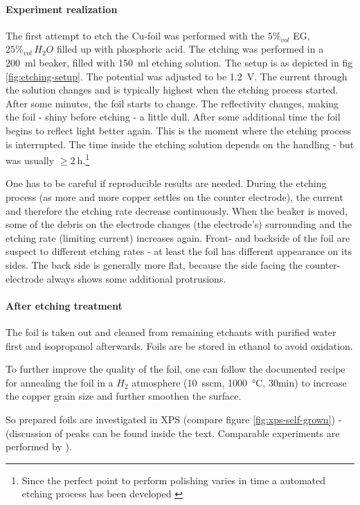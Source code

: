 
\paragraph{Experiment realization}The first attempt to etch the Cu-foil was performed with the $5\%_{vol}$ EG, $25\%_{vol}\,H_2O$ filled up with phosphoric acid. The etching was performed in a \SI{200}{\ml} beaker, filled with \SI{150}{\ml} etching solution. The setup is as depicted in fig \ref{fig:etching-setup}. The potential was adjusted to be \SI{1.2}{\V}. The current through the solution changes and is typically highest when the etching process started. After some minutes, the foil starts to change. The reflectivity changes, making the foil - shiny before etching - a little dull. After some additional time the foil begins to reflect light better again. This is the moment where the etching process is interrupted. The time inside the etching solution depends on the handling - but was usually $\geq \SI{2}{\hour}$.\footnote{Since the perfect point to perform polishing varies in time a automated etching process has been developed \cite{palmieri_besides_2001}}

One has to be careful if reproducible results are needed. During the etching process (as more and more copper settles on the counter electrode), the current and therefore the etching rate decrease continuously. When the beaker is moved, some of the debris on the electrode changes (the electrode's) surrounding and the etching rate (limiting current) increases again. Front- and backside of the foil are suspect to different etching rates - at least the foil has different appearance on its sides. The back side is generally more flat, because the side facing the counter-electrode always shows some additional protrusions.

\paragraph{After etching treatment}
The foil is taken out and cleaned from remaining etchants with purified water first and isopropanol afterwards. Foils are be stored in ethanol to avoid oxidation. 

To further improve the quality of the foil, one can follow the documented recipe for annealing the foil in a $H_2$ atmosphere (\SI{10}{sscm}, \SI{1000}{\celsius}, 30min)\cite{kim_synthesis_2012} to increase the copper grain size and further smoothen the surface. 

So prepared foils are investigated in XPS (compare figure \ref{fig:xps-self-grown}) - (discussion of peaks can be found inside the text. Comparable experiments  are performed by \cite[8]{stables_report_2008}).

